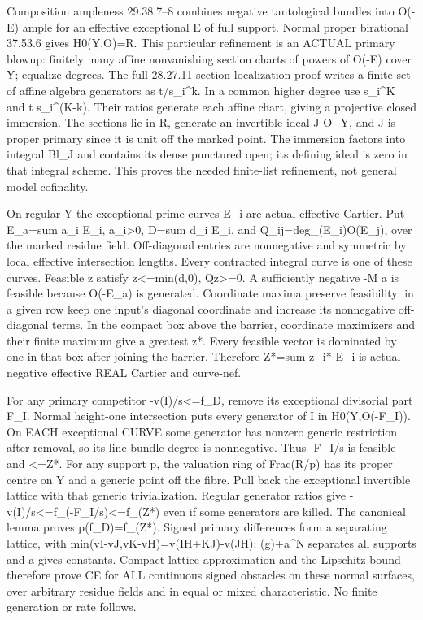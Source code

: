 Composition ampleness 29.38.7--8 combines negative tautological bundles into O(-E) ample for an effective exceptional E of full support. Normal proper birational 37.53.6 gives H0(Y,O)=R. This particular refinement is an ACTUAL primary blowup: finitely many affine nonvanishing section charts of powers of O(-E) cover Y; equalize degrees. The full 28.27.11 section-localization proof writes a finite set of affine algebra generators as t/s\_i\textasciicircum{}k. In a common higher degree use s\_i\textasciicircum{}K and t s\_i\textasciicircum{}(K-k). Their ratios generate each affine chart, giving a projective closed immersion. The sections lie in R, generate an invertible ideal J O\_Y, and J is proper primary since it is unit off the marked point. The immersion factors into integral Bl\_J and contains its dense punctured open; its defining ideal is zero in that integral scheme. This proves the needed finite-list refinement, not general model cofinality.

On regular Y the exceptional prime curves E\_i are actual effective Cartier. Put E\_a=sum a\_i E\_i, a\_i\textgreater{}0, D=sum d\_i E\_i, and Q\_ij=deg\_(E\_i)O(E\_j), over the marked residue field. Off-diagonal entries are nonnegative and symmetric by local effective intersection lengths. Every contracted integral curve is one of these curves. Feasible z satisfy z\textless{}=min(d,0), Qz\textgreater{}=0. A sufficiently negative -M a is feasible because O(-E\_a) is generated. Coordinate maxima preserve feasibility: in a given row keep one input's diagonal coordinate and increase its nonnegative off-diagonal terms. In the compact box above the barrier, coordinate maximizers and their finite maximum give a greatest z*. Every feasible vector is dominated by one in that box after joining the barrier. Therefore Z*=sum z\_i* E\_i is actual negative effective REAL Cartier and curve-nef.

For any primary competitor -v(I)/s\textless{}=f\_D, remove its exceptional divisorial part F\_I. Normal height-one intersection puts every generator of I in H0(Y,O(-F\_I)). On EACH exceptional CURVE some generator has nonzero generic restriction after removal, so its line-bundle degree is nonnegative. Thus -F\_I/s is feasible and \textless{}=Z*. For any support p, the valuation ring of Frac(R/p) has its proper centre on Y and a generic point off the fibre. Pull back the exceptional invertible lattice with that generic trivialization. Regular generator ratios give -v(I)/s\textless{}=f\_(-F\_I/s)\textless{}=f\_(Z*) even if some generators are killed. The canonical lemma proves p(f\_D)=f\_(Z*). Signed primary differences form a separating lattice, with min(vI-vJ,vK-vH)=v(IH+KJ)-v(JH); (g)+a\textasciicircum{}N separates all supports and a gives constants. Compact lattice approximation and the Lipschitz bound therefore prove CE for ALL continuous signed obstacles on these normal surfaces, over arbitrary residue fields and in equal or mixed characteristic. No finite generation or rate follows.

